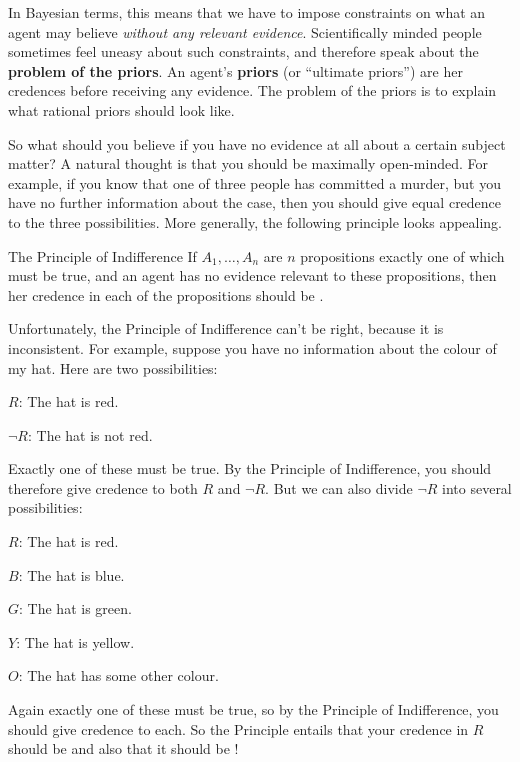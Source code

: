 In Bayesian terms, this means that we have to impose constraints on
what an agent may believe \emph{without any relevant
  evidence}. Scientifically minded people sometimes feel uneasy about such
constraints, and therefore speak about the \textbf{problem of the
  priors}. An agent's \textbf{priors} (or ``ultimate priors'') are her
credences before receiving any evidence. The problem of the priors is
to explain what rational priors should look like. 

So what should you believe if you have no evidence at all about a
certain subject matter? A natural thought is that you should be
maximally open-minded. For example, if you know that one of
three people has committed a murder, but you have no further
information about the case, then you should give equal credence to the
three possibilities. More generally, the following principle looks
appealing.

\begin{genericthm}{The Principle of Indifference}
  If $A_1,\ldots,A_n$ are $n$ propositions exactly one of which must
  be true, and an agent has no evidence relevant to these
  propositions, then her credence in each of the propositions should
  be .
\end{genericthm}

Unfortunately, the Principle of Indifference can't be right, because it is
inconsistent. For example, suppose you have no information about the
colour of my hat. Here are two possibilities:
\begin{enumerate*}
\item[$R$:] The hat is red.
\item[$\neg R$:] The hat is not red.
\end{enumerate*}
Exactly one of these must be true. By the Principle of Indifference,
you should therefore give credence  to both $R$ and
$\neg R$. But we can also divide $\neg R$ into several
possibilities:
\begin{enumerate*}
\item[$R$:] The hat is red.
\item[$B$:] The hat is blue.
\item[$G$:] The hat is green.
\item[$Y$:] The hat is yellow.
\item[$O$:] The hat has some other colour.
\end{enumerate*}
Again exactly one of these must be true, so by the Principle of
Indifference, you should give credence  to each. So the
Principle entails that your credence in $R$ should be 
and also that it should be !

